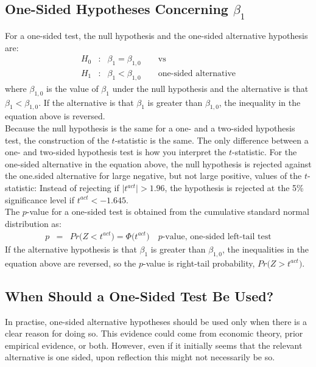 \subsection{One-Sided Hypotheses Concerning \texorpdfstring{$\beta_{1}$}{Beta}}
For a one-sided test, the null hypothesis and the one-sided alternative hypothesis are:
\begin{eqnarray}
	H_{0}&:& \beta_{1} = \beta_{1, 0}\qquad\text{vs}\\
	H_{1}&:& \beta_{1} < \beta_{1, 0}\qquad\text{one-sided alternative}
\end{eqnarray}
where $\beta_{1, 0}$ is the value of $\beta_{1}$ under the null hypothesis and the alternative is that $\beta_{1} < \beta_{1, 0}$. If the alternative is that $\beta_{1}$ is greater than $\beta_{1, 0}$, the inequality in the equation above is reversed.\\
Because the null hypothesis is the same for a one- and a two-sided hypothesis test, the construction of the $t$-statistic is the same. The only difference between a one- and two-sided hypothesis test is how you interpret the $t$-statistic. For the one-sided alternative in the equation above, the null hypothesis is rejected against the one.sided alternative for large negative, but not large positive, values of the $t$-statistic: Instead of rejecting if $\bigr\rvert t^{act}\bigr\rvert > 1.96$, the hypothesis is rejected at the 5\% significance level if $t^{act} < -1.645$.\\
The $p$-value for a one-sided test is obtained from the cumulative standard normal distribution as:
\begin{eqnarray}
	p &=& Pr\big(Z < t^{act}\big) = \Phi\big(t^{act}\big)\quad\text{$p$-value, one-sided left-tail test}
\end{eqnarray}
If the alternative hypothesis is that $\beta_{1}$ is greater than $\beta_{1, 0}$, the inequalities in the equation above are reversed, so the $p$-value is right-tail probability, $Pr\big(Z > t^{act}\big)$.

\subsection{When Should a One-Sided Test Be Used?}
In practise, one-sided alternative hypotheses should be used only when there is a clear reason for doing so. This evidence could come from economic theory, prior empirical evidence, or both. However, even if it initially seems that the relevant alternative is one sided, upon reflection this might not necessarily be so.

